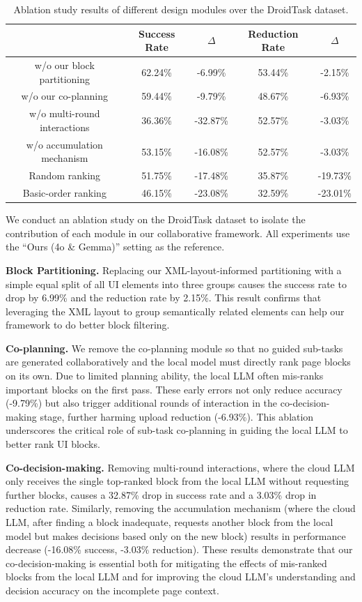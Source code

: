\begin{table}[htbp]
  \caption{Ablation study results of different design modules over the DroidTask dataset.}
  \label{ablation-results}
  \centering
  \begin{tabular}{ccc|cc}
    \toprule
     & \bf{Success Rate} & \bf{$\Delta$} & {\bf Reduction Rate} & {\bf $\Delta$}\\
    \midrule
    w/o our block partitioning      & 62.24\% & -6.99\%   & 53.44\%   & -2.15\%\\
    w/o our co-planning       & 59.44\% & -9.79\% & 48.67\% & -6.93\%\\
    w/o multi-round interactions         & 36.36\% & -32.87\% & 52.57\%   & -3.03\%\\
    w/o accumulation mechanism          & 53.15\% & -16.08\% & 52.57\%   & -3.03\%\\
    \midrule
    Random ranking        & 51.75\%  & -17.48\% & 35.87\%   & -19.73\%\\
    Basic-order ranking   & 46.15\% & -23.08\%  & 32.59\%   & -23.01\%\\
    \bottomrule
  \end{tabular}
\end{table}

We conduct an ablation study on the DroidTask dataset to isolate the contribution of each module in our collaborative framework. All experiments use the ``Ours (4o \& Gemma)'' setting as the reference.

\textbf{Block Partitioning.} Replacing our XML-layout-informed partitioning with a simple equal split of all UI elements into three groups causes the success rate to drop by 6.99\% and the reduction rate by 2.15\%. This result confirms that leveraging the XML layout to group semantically related elements can help our framework to do better block filtering.

\textbf{Co-planning.} We remove the co-planning module so that no guided sub-tasks are generated collaboratively and the local model must directly rank page blocks on its own. Due to limited planning ability, the local LLM often mis-ranks important blocks on the first pass. These early errors not only reduce accuracy (-9.79\%) but also trigger additional rounds of interaction in the co-decision-making stage, further harming upload reduction (-6.93\%). This ablation underscores the critical role of sub-task co-planning in guiding the local LLM to better rank UI blocks. 

\textbf{Co-decision-making.} Removing multi-round interactions, where the cloud LLM only receives the single top-ranked block from the local LLM without requesting further blocks, causes a 32.87\% drop in success rate and a 3.03\% drop in reduction rate. Similarly, removing the accumulation mechanism (where the cloud LLM, after finding a block inadequate, requests another block from the local model but makes decisions based only on the new block) results in performance decrease (-16.08\% success, -3.03\% reduction). These results demonstrate that our co-decision-making is essential both for mitigating the effects of mis-ranked blocks from the local LLM and for improving the cloud LLM's understanding and decision accuracy on the incomplete page context.


